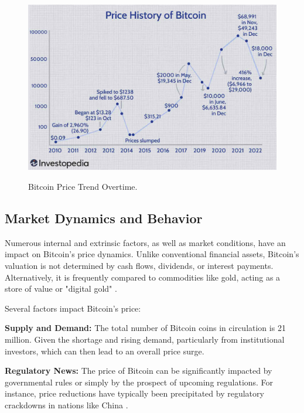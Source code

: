 \begin{figure}[H]
\centering
\includegraphics[scale=0.25]{Fig1.jpg}
\caption{Bitcoin Price Trend Overtime.}
\citep{noauthor_bitcoins_nodate}
\end{figure}



\subsection{Market Dynamics and Behavior}
Numerous internal and extrinsic factors, as well as market conditions, have an impact on Bitcoin's price dynamics. Unlike conventional financial assets, Bitcoin's valuation is not determined by cash flows, dividends, or interest payments. Alternatively, it is frequently compared to commodities like gold, acting as a store of value or "digital gold" \citep{DBLP:conf/ecis/GlaserZHW14}.
\smallskip

Several factors impact Bitcoin's price:
\smallskip

\textbf{Supply and Demand:} The total number of Bitcoin coins in circulation is 21 million. Given the shortage and rising demand, particularly from institutional investors, which can then lead to an overall price surge. \citep{DBLP:journals/ijecommerce/PolasikPWKL15}

\smallskip

\textbf{Regulatory News:} The price of Bitcoin can be significantly impacted by governmental rules or simply by the prospect of upcoming regulations. For instance, price reductions have typically been precipitated by regulatory crackdowns in nations like China \citep{feng_informed_2018}.

